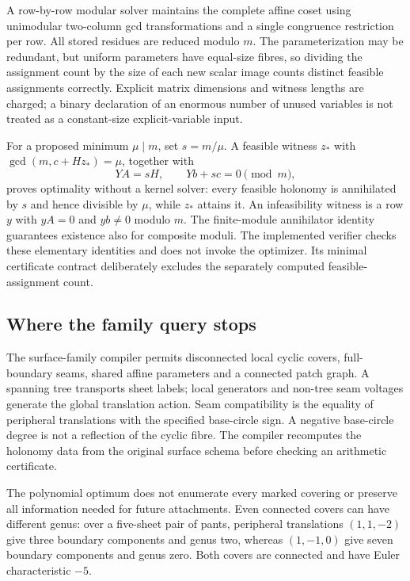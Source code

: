 A row-by-row modular solver maintains the complete affine coset using
unimodular two-column gcd transformations and a single congruence restriction
per row. All stored residues are reduced modulo $m$. The parameterization
may be redundant, but uniform parameters have equal-size fibres, so dividing
the assignment count by the size of each new scalar image counts distinct
feasible assignments correctly. Explicit matrix dimensions and witness
lengths are charged; a binary declaration of an enormous number of unused
variables is not treated as a constant-size explicit-variable input.

For a proposed minimum $\mu\mid m$, set $s=m/\mu$. A feasible witness
$z_*$ with $\gcd(m,c+Hz_*)=\mu$, together with
\[
 YA=sH,\qquad Yb+sc=0\pmod m,
\]
proves optimality without a kernel solver: every feasible holonomy is
annihilated by $s$ and hence divisible by $\mu$, while $z_*$ attains it.
An infeasibility witness is a row $y$ with $yA=0$ and $yb\ne0$ modulo $m$.
The finite-module annihilator identity guarantees existence also for
composite moduli. The implemented verifier checks these elementary
identities and does not invoke the optimizer. Its minimal certificate
contract deliberately excludes the separately computed feasible-assignment
count.

\subsection{Where the family query stops}

The surface-family compiler permits disconnected local cyclic covers,
full-boundary seams, shared affine parameters and a connected patch graph.
A spanning tree transports sheet labels; local generators and non-tree
seam voltages generate the global translation action. Seam compatibility
is the equality of peripheral translations with the specified base-circle
sign. A negative base-circle degree is not a reflection of the cyclic
fibre. The compiler recomputes the holonomy data from the original surface
schema before checking an arithmetic certificate.

The polynomial optimum does not enumerate every marked covering or preserve
all information needed for future attachments. Even connected covers can
have different genus: over a five-sheet pair of pants, peripheral
translations $(1,1,-2)$ give three boundary components and genus two,
whereas $(1,-1,0)$ give seven boundary components and genus zero. Both
covers are connected and have Euler characteristic $-5$.

